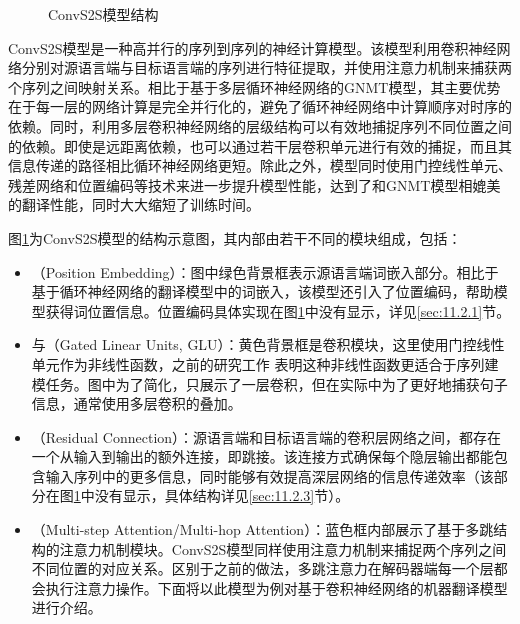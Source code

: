 \begin{figure}[htp]
\centering

\caption{ConvS2S模型结构}
\label{fig:11-12}
\end{figure}

\parinterval ConvS2S模型是一种高并行的序列到序列的神经计算模型。该模型利用卷积神经网络分别对源语言端与目标语言端的序列进行特征提取，并使用注意力机制来捕获两个序列之间映射关系。相比于基于多层循环神经网络的GNMT模型，其主要优势在于每一层的网络计算是完全并行化的，避免了循环神经网络中计算顺序对时序的依赖。同时，利用多层卷积神经网络的层级结构可以有效地捕捉序列不同位置之间的依赖。即使是远距离依赖，也可以通过若干层卷积单元进行有效的捕捉，而且其信息传递的路径相比循环神经网络更短。除此之外，模型同时使用门控线性单元、残差网络和位置编码等技术来进一步提升模型性能，达到了和GNMT模型相媲美的翻译性能，同时大大缩短了训练时间。

\parinterval 图\ref{fig:11-12}为ConvS2S模型的结构示意图，其内部由若干不同的模块组成，包括：

\begin{itemize}
\item {\small{}}（Position Embedding）：图中绿色背景框表示源语言端词嵌入部分。相比于基于循环神经网络的翻译模型中的词嵌入，该模型还引入了位置编码，帮助模型获得词位置信息。位置编码具体实现在图\ref{fig:11-12}中没有显示，详见\ref{sec:11.2.1}节。

\item {\small{}}与{\small{}}（Gated Linear Units, GLU）：黄色背景框是卷积模块，这里使用门控线性单元作为非线性函数，之前的研究工作 表明这种非线性函数更适合于序列建模任务。图中为了简化，只展示了一层卷积，但在实际中为了更好地捕获句子信息，通常使用多层卷积的叠加。

\item {\small{}}（Residual Connection）：源语言端和目标语言端的卷积层网络之间，都存在一个从输入到输出的额外连接，即跳接。该连接方式确保每个隐层输出都能包含输入序列中的更多信息，同时能够有效提高深层网络的信息传递效率（该部分在图\ref{fig:11-12}中没有显示，具体结构详见\ref{sec:11.2.3}节）。

\item {\small{}}（Multi-step Attention/Multi-hop Attention）：蓝色框内部展示了基于多跳结构的注意力机制模块。ConvS2S模型同样使用注意力机制来捕捉两个序列之间不同位置的对应关系。区别于之前的做法，多跳注意力在解码器端每一个层都会执行注意力操作。下面将以此模型为例对基于卷积神经网络的机器翻译模型进行介绍。
\end{itemize}

